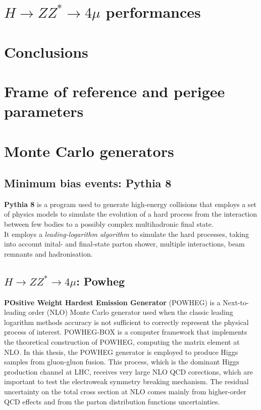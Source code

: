 \documentclass[a4paper,twoside,12pt]{article}
\begin{document}
\section{$H \rightarrow ZZ^* \rightarrow 4\mu$ performances}

\section{Conclusions}\label{sec:conclusions}

\newpage

\begin{appendices}
\section{Frame of reference and perigee parameters} \label{appendix:perigee}

\section{Monte Carlo generators}\label{appendix:MC}

\subsection{Minimum bias events: Pythia 8}
\textbf{Pythia 8} is a program used to generate high-energy collisions that employs a set of physics
models to simulate the evolution of a hard process from the interaction between few bodies 
to a possibly complex multihadronic final state\cite{Pythia8}. 	\\
It employs a \textit{leading-logarithm algorithm} to simulate the hard processes, 
taking into account inital- and final-state parton shower, multiple interactions, beam remnants
and hadronisation. 

\subsection{$H \rightarrow ZZ^* \rightarrow 4\mu$: Powheg}
\textbf{POsitive Weight Hardest Emission Generator} (POWHEG) is a Next-to-leading order (NLO) Monte Carlo generator
used when the classic leading logarithm methods accuracy is not sufficient to correctly 
represent the physical process of interest. POWHEG-BOX is a computer framework 
that implements the theoretical construction of POWHEG, computing the matrix element 
at NLO\cite{Powheg}. In this thesis, the POWHEG generator is employed to produce
Higgs samples from gluon-gluon fusion. This process, which is the dominant Higgs production 
channel at LHC, receives very large NLO QCD corections, which are important to test the 
electroweak symmetry breaking mechanism\cite{Powheg_ggH}. The residual uncertainty 
on the total cross section 
at NLO comes mainly from higher-order QCD effects and from the parton distribution
functions uncertainties.

\newpage

\end{appendices}

\baselineskip 25pt
\baselineskip 5pt
\baselineskip 16pt

\appendix




\end{document}
